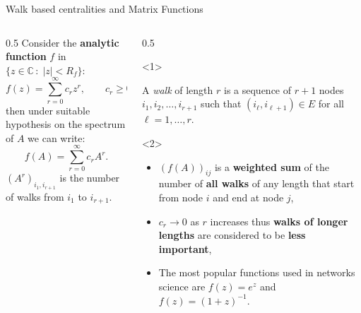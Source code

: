 \documentclass[aspectratio=169,xcolor=dvipsnames]{beamer}
\begin{document}
\begin{frame}{\faWalking\; Walk based centralities and Matrix Functions}
\vspace{1em}
\begin{columns}
\begin{column}{0.5\columnwidth}
Consider the \textbf{analytic function} $f$ in $\{ z \in \mathbb{C}\,:\; |z| < R_f\}$:
\[f(z) = \sum_{r=0}^\infty c_r z^r, \qquad c_r\geq 0\] 
then \alert{under suitable hypothesis} on the spectrum of $A$ we can write: 
\[f(A) = \sum_{r=0}^\infty c_r A^r.\]
\alert{\faWalking} $(A^r)_{i_1,i_{r+1}}$ is the number of walks from $i_{1}$ to $i_{r+1}$.
\end{column}
\begin{column}{0.5\columnwidth}
\centering
\begin{onlyenv}<1>

{}

A \alert{\it walk} of length $r$ is a sequence of $r+1$ nodes $i_1, i_2,\ldots, i_{r+1}$ such that $(i_\ell,i_{\ell+1})\in E$ for all $\ell = 1,\ldots,r$.
\end{onlyenv}

\begin{onlyenv}<2>
\begin{itemize}
    \item $(f(A))_{ij}$ is a \textbf{weighted sum} of the number of \textbf{all walks} of any length that start from node $i$ and end at node $j$,
    \item $c_r\to 0$ as $r$ increases thus \textbf{walks of longer lengths} are considered to be \textbf{less important},
    \item The \alert{most popular functions} used in networks science are $f(z) = e^z$ and $f(z) = (1+z)^{-1}$.
\end{itemize}
\end{onlyenv}
\end{column}
\end{columns}
\end{frame}
\end{document}
